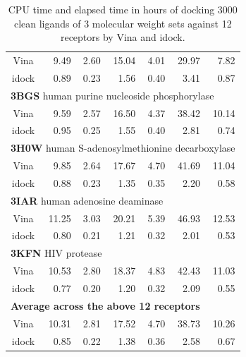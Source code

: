 \documentclass[12pt]{article}
\begin{document}
\begin{table}
\begin{tabular}{crrrrrr}
Vina  &  9.49 &  2.60 & 15.04 &  4.01 & 29.97 &  7.82\\
idock &  0.89 &  0.23 &  1.56 &  0.40 &  3.41 &  0.87\\
\multicolumn{7}{l}{\textbf{3BGS} human purine nucleoside phosphorylase}\\
Vina  &  9.59 &  2.57 & 16.50 &  4.37 & 38.42 & 10.14\\
idock &  0.95 &  0.25 &  1.55 &  0.40 &  2.81 &  0.74\\
\multicolumn{7}{l}{\textbf{3H0W} human S-adenosylmethionine decarboxylase}\\
Vina  &  9.85 &  2.64 & 17.67 &  4.70 & 41.69 & 11.04\\
idock &  0.88 &  0.23 &  1.35 &  0.35 &  2.20 &  0.58\\
\multicolumn{7}{l}{\textbf{3IAR} human adenosine deaminase}\\
Vina  & 11.25 &  3.03 & 20.21 &  5.39 & 46.93 & 12.53\\
idock &  0.80 &  0.21 &  1.21 &  0.32 &  2.01 &  0.53\\
\multicolumn{7}{l}{\textbf{3KFN} HIV protease}\\
Vina  & 10.53 &  2.80 & 18.37 &  4.83 & 42.43 & 11.03\\
idock &  0.77 &  0.20 &  1.20 &  0.32 &  2.09 &  0.55\\
\multicolumn{7}{l}{\textbf{Average across the above 12 receptors}}\\
Vina  & 10.31 &  2.81 & 17.52 &  4.70 & 38.73 & 10.26\\
idock &  0.85 &  0.22 &  1.38 &  0.36 &  2.58 &  0.67\\
\hline
\end{tabular}
\caption{\label{ExecutionTime} CPU time and elapsed time in hours of docking 3000 clean ligands of 3 molecular weight sets against 12 receptors by Vina and idock.}
\end{table}
\end{document}
